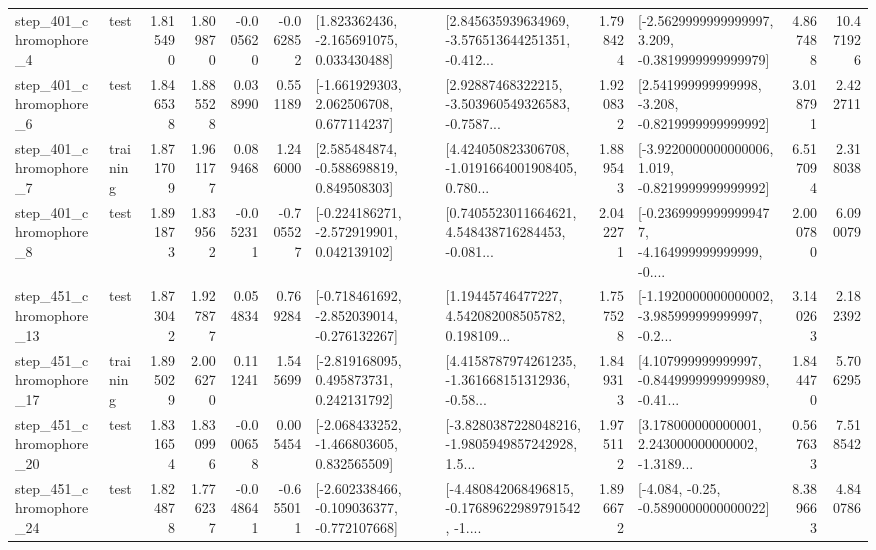 \begin{tabular}{llrrrrllrlrr}
   step\_401\_chromophore\_4 &      test &      1.815490 &    1.809870 &     -0.005620 & -0.062852 &    [1.823362436, -2.165691075, 0.033430488] &  [2.845635939634969, -3.576513644251351, -0.412... &       1.798424 &  [-2.5629999999999997, 3.209, -0.3819999999999979] &            4.867488 &         10.471926 \\
   step\_401\_chromophore\_6 &      test &      1.846538 &    1.885528 &      0.038990 &  0.551189 &    [-1.661929303, 2.062506708, 0.677114237] &  [2.92887468322215, -3.503960549326583, -0.7587... &       1.920832 &   [2.541999999999998, -3.208, -0.8219999999999992] &            3.018791 &          2.422711 \\
   step\_401\_chromophore\_7 &  training &      1.871709 &    1.961177 &      0.089468 &  1.246000 &    [2.585484874, -0.588698819, 0.849508303] &  [4.424050823306708, -1.0191664001908405, 0.780... &       1.889543 &  [-3.9220000000000006, 1.019, -0.8219999999999992] &            6.517094 &          2.318038 \\
   step\_401\_chromophore\_8 &      test &      1.891873 &    1.839562 &     -0.052311 & -0.705527 &   [-0.224186271, -2.572919901, 0.042139102] &  [0.7405523011664621, 4.548438716284453, -0.081... &       2.042271 &  [-0.23699999999999477, -4.164999999999999, -0.... &            2.000780 &          6.090079 \\
  step\_451\_chromophore\_13 &      test &      1.873042 &    1.927877 &      0.054834 &  0.769284 &  [-0.718461692, -2.852039014, -0.276132267] &  [1.19445746477227, 4.542082008505782, 0.198109... &       1.757528 &  [-1.1920000000000002, -3.985999999999997, -0.2... &            3.140263 &          2.182392 \\
  step\_451\_chromophore\_17 &  training &      1.895029 &    2.006270 &      0.111241 &  1.545699 &    [-2.819168095, 0.495873731, 0.242131792] &  [4.4158787974261235, -1.361668151312936, -0.58... &       1.849313 &  [4.107999999999997, -0.8449999999999989, -0.41... &            1.844470 &          5.706295 \\
  step\_451\_chromophore\_20 &      test &      1.831654 &    1.830996 &     -0.000658 &  0.005454 &   [-2.068433252, -1.466803605, 0.832565509] &  [-3.8280387228048216, -1.9805949857242928, 1.5... &       1.975112 &  [3.178000000000001, 2.243000000000002, -1.3189... &            0.567633 &          7.518542 \\
  step\_451\_chromophore\_24 &      test &      1.824878 &    1.776237 &     -0.048641 & -0.655011 &  [-2.602338466, -0.109036377, -0.772107668] &  [-4.480842068496815, -0.17689622989791542, -1.... &       1.896672 &               [-4.084, -0.25, -0.5890000000000022] &            8.389663 &          4.840786 \\

\end{tabular}
